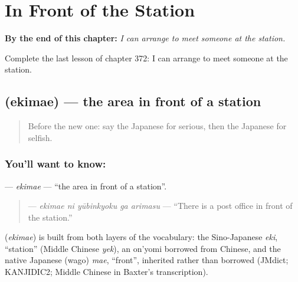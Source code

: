 
\chapter{In Front of the Station}
\label{ch:ja-in-front-of-the-station}

\begin{chapteropening}
\textbf{By the end of this chapter:} \emph{I can arrange to meet someone at the station.}

Complete the last lesson of chapter 372: I can arrange to meet someone at the station.
\end{chapteropening}

\section[\texorpdfstring{\ja{えきまえ} (ekimae)}{えきまえ (ekimae)}]{ (ekimae) — the area in front of a station}

\label{lesson:JA-C372-ekimae}



\begin{quote}
Before the new one: say the Japanese for serious, then the Japanese for selfish.
\end{quote}

\subsection*{You'll want to know: }
\textbf{} — \emph{ekimae} — \textquotedblleft{}the area in front of a station\textquotedblright{}.

\begin{quote}
\textbf{  } — \emph{ekimae ni yūbinkyoku ga arimasu} — \textquotedblleft{}There is a post office in front of the station.\textquotedblright{}
\end{quote}

\begin{cousinweb}
\textbf{} (\emph{ekimae}) is built from both layers of the vocabulary: the Sino-Japanese \emph{eki}, \textquotedblleft{}station\textquotedblright{} (Middle Chinese \emph{yek}), an on'yomi borrowed from Chinese, and the native Japanese (wago) \emph{mae}, \textquotedblleft{}front\textquotedblright{}, inherited rather than borrowed (JMdict; KANJIDIC2; Middle Chinese in Baxter's transcription).
\end{cousinweb}


